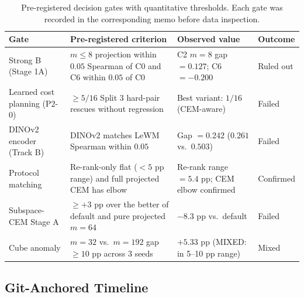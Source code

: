 \begin{table}[h]
\centering
\footnotesize
\setlength{\tabcolsep}{3pt}
\begin{tabular}{@{}p{} p{} p{} p{}@{}}
\toprule
Gate & Pre-registered criterion & Observed value & Outcome \\
\midrule
Strong B (Stage 1A) & $m \leq 8$ projection within $0.05$ Spearman of C0 and C6 within $0.05$ of C0 & C2 $m{=}8$ gap $= 0.127$; C6 $= -0.200$ & Ruled out \\
Learned cost planning (P2-0) & $\geq 5/16$ Split 3 hard-pair rescues without regression & Best variant: $1/16$ (CEM-aware) & Failed \\
DINOv2 encoder (Track B) & DINOv2 matches LeWM Spearman within $0.05$ & Gap $= 0.242$ ($0.261$ vs.\ $0.503$) & Failed \\
Protocol matching & Re-rank-only flat ($< 5$ pp range) and full projected CEM has elbow & Re-rank range $= 5.4$ pp; CEM elbow confirmed & Confirmed \\
Subspace-CEM Stage A & $\geq +3$ pp over the better of default and pure projected $m{=}64$ & $-8.3$ pp vs.\ default & Failed \\
Cube anomaly & $m{=}32$ vs.\ $m{=}192$ gap $\geq 10$ pp across 3 seeds & $+5.33$ pp (MIXED: in 5--10 pp range) & Mixed \\
\bottomrule
\end{tabular}
\caption{Pre-registered decision gates with quantitative thresholds.  Each
gate was recorded in the corresponding memo before data inspection.}
\label{tab:preregistered-gates}
\end{table}

\subsection{Git-Anchored Timeline}

